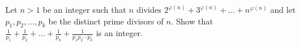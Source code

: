 Let $n>1$ be an integer such that $n$ divides $2^{\varphi(n)}+3^{\varphi(n)}+\ldots+n^{\varphi(n)}$ and let $p_1,p_2,\ldots,p_k$ be the distinct prime divisors of $n$. Show that $\frac{1}{p_1}+\frac{1}{p_2}+\ldots+\frac{1}{p_k}+\frac{1}{p_1p_2\cdots p_k}$ is an integer.
